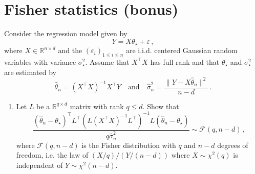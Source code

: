 \documentclass[a4paper,10pt,fleqn]{article}
\newcommand{\eqsp}{\,}
\newcommand{\rset}{\ensuremath{\mathbb{R}}}
\newcommand{\1}{\ensuremath{\mathbbm{1}}}
\newcommand{\param}{\theta}
\begin{document}
\section{Fisher statistics (bonus)}
Consider the regression model given by
$$
Y = X\param_{\star}+ \varepsilon\eqsp,
$$
where $X\in\rset^{n\times d}$ and the $(\varepsilon_{i})_{1\leqslant i \leqslant n}$ are i.i.d. centered Gaussian random variables with variance $\sigma_{\star}^2$. Assume that $X^\top X$ has full rank and that $\param_\star$ and $\sigma_{\star}^2$ are estimated by 
$$
\widehat \param_n = (X^\top X)^{-1}X^\top Y\quad\mathrm{and}\quad \widehat \sigma^2_n =\frac{\|Y - X\widehat \param_n \|^2}{n-d}\eqsp.
$$
\begin{enumerate}
\item  Let $L$ be a $\rset^{q\times d}$ matrix with rank $q\leqslant d$. Show that
$$
\frac{(\widehat \param_{n} -\param_{\star})^\top L^\top(L(X^\top X)^{-1}L^\top)^{-1}L(\widehat \param_{n} -\param_{\star})}{q\widehat\sigma^2_{n}} \sim \mathcal{F}(q,n-d)\eqsp,
$$
where $\mathcal{F}(q,n-d)$ is the Fisher distribution with $q$ and $n-d$ degrees of freedom, i.e. the law of $(X/q)/(Y/(n-d))$ where $X\sim\chi^2(q)$ is independent of $Y\sim\chi^2(n-d)$.


\end{enumerate}
\end{document}
